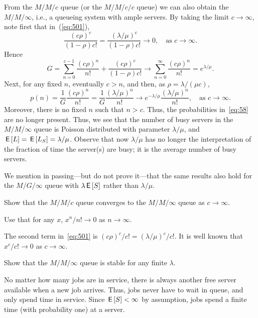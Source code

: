 From the $M/M/c$ queue (or the $M/M/c/c$ queue) we can also obtain the
$M/M/\infty$, i.e., a queueing system with ample servers. By taking
the limit $c\to\infty$, note first that in~(\ref{eq:501}),
\begin{equation*}
\frac{(c\rho)^c}{(1-\rho)c!} = \frac{(\lambda/\mu)^c}{(1-\rho)c!}\to 0, \quad\text{as } c\to \infty.
\end{equation*}
Hence
\begin{equation*}
G =\sum_{n=0}^{c-1} \frac{(c\rho)^n}{n!} + \frac{(c\rho)^c}{(1-\rho)c!} \to \sum_{n=0}^{\infty} \frac{(c\rho)^n}{n!} = e^{\lambda/\mu}.
\end{equation*}
Next, for any fixed $n$, eventually $c>n$, and then, as $\rho=\lambda/(\mu c)$, 
\begin{equation*}
  p(n) = \frac{1}G \frac{(c\rho)^n}{n!} = \frac{1}G \frac{(\lambda/\mu)^n}{n!} 
\to e^{-\lambda/\mu}  \frac{(\lambda/\mu)^n}{n!}, \quad\text{as } c\to\infty.
\end{equation*}
Moreover, there is no fixed $n$ such that $n>c$. Thus, the probabilities in~\eqref{eq:58} are no longer present. Thus, we see that the number of busy servers in the $M/M/\infty$ queue is
Poisson distributed with parameter $\lambda/\mu$, and
$\,\mathsf{E}\left[L\right] = \,\mathsf{E}\left[L_S\right] = \lambda/\mu$.  Observe that now $\lambda/\mu$ has
no longer the interpretation of the fraction of time the server(s) are
busy; it is the average number of busy servers.

We mention in passing---but do not
prove it---that the same results also hold for the $M/G/\infty$ queue
with $\lambda \,\mathsf{E}\left[S\right]$ rather than $\lambda/\mu$.


\begin{exercise}{\faFlask}
 Show that the $M/M/c$ queue converges to the $M/M/\infty$ queue as $c\to\infty$. 
  \begin{hint}
Use that for any $x$, $x^n/n!\to 0$ as $n\to\infty$.
  \end{hint}
 \begin{solution}
   The second term in~\eqref{eq:501} is $(c\rho)^c/c! = (\lambda/\mu)^c/c!$. It is well
   known that $x^c/c!\to 0$ as $c\to \infty$.
\end{solution}
\end{exercise}


\begin{exercise}{\faFlask}
 Show that the $M/M/\infty$ queue is stable for any finite $\lambda$. 
 \begin{solution}
    No matter how many jobs are in service, there is always another
   free server available when a new job arrives. Thus, jobs never have
   to wait in queue, and only spend time in service. Since
   $\,\mathsf{E}\left[S\right] < \infty$ by assumption, jobs spend a finite time (with
   probability one) at a server.
\end{solution}
\end{exercise}

